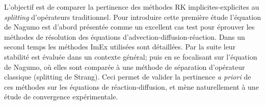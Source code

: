 L'objectif est de comparer la pertinence des méthodes RK implicites-explicites au \textit{splitting} d'opérateurs traditionnel.
Pour introduire cette première étude l'équation de Nagumo est d'abord présentée comme un excellent cas
test pour éprouver les méthodes de résolution des équations d'advection-diffusion-réaction. 
Dans un second temps les méthodes ImEx utilisées sont détaillées. Par la suite leur stabilité
est évaluée dans un contexte général; puis en se focalisant sur l'équation de Nagumo, où elles sont comparée 
à une méthode de séparation d'opérateur classique (splitting de Strang).
Ceci permet de valider la pertinence \textit{a priori} de ces méthodes sur les équations de réaction-diffusion, 
et mène naturellement à une étude de convergence expérimentale.